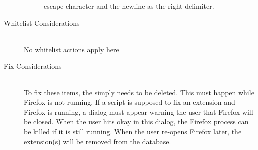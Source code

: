 \begin{description}
\begin{description}
  escape character and the newline as the right delimiter.  
\end{description}
\item[Whitelist Considerations] \hfill \\
No whitelist actions apply here
\item[Fix Considerations] \hfill \\
To fix these items, the  simply needs to be deleted.  This must
happen while Firefox is not running.  If a script is supposed to fix an
extension and Firefox is running, a dialog must appear warning the user that
Firefox will be closed.  When the user hits okay in this dialog, the Firefox
process can be killed if it is still running.  When the user re-opens Firefox
later, the extension(s) will be removed from the database.
\end{description}

